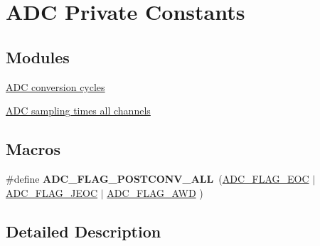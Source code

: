 \hypertarget{group___a_d_c___private___constants}{}\section{A\+DC Private Constants}
\label{group___a_d_c___private___constants}
\subsection*{Modules}
\begin{DoxyCompactItemize}
\item 
\hyperlink{group___a_d_c__conversion__cycles}{A\+D\+C conversion cycles}
\item 
\hyperlink{group___a_d_c__sampling__times__all__channels}{A\+D\+C sampling times all channels}
\end{DoxyCompactItemize}
\subsection*{Macros}
\begin{DoxyCompactItemize}
\item 
\mbox{\label{group___a_d_c___private___constants_ga790f33c46bdd17e04ec3421d98a73504}} 
\#define {\bfseries A\+D\+C\+\_\+\+F\+L\+A\+G\+\_\+\+P\+O\+S\+T\+C\+O\+N\+V\+\_\+\+A\+LL}~(\hyperlink{group___a_d_c__flags__definition_gaf2c6fdf7e9ab63b778149e5fb56413d4}{A\+D\+C\+\_\+\+F\+L\+A\+G\+\_\+\+E\+OC} $\vert$ \hyperlink{group___a_d_c__flags__definition_ga4df8eea8ab83d98104ee15a339743a4e}{A\+D\+C\+\_\+\+F\+L\+A\+G\+\_\+\+J\+E\+OC} $\vert$ \hyperlink{group___a_d_c__flags__definition_gadb75a4b430fb84950232b7a8f3a6a877}{A\+D\+C\+\_\+\+F\+L\+A\+G\+\_\+\+A\+WD} )
\end{DoxyCompactItemize}


\subsection{Detailed Description}
